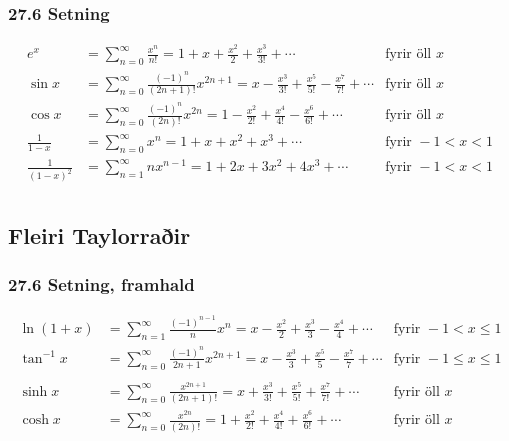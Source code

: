  \subsubsection{27.6 Setning}{\small
\begin{align*}
e^x&=\sum_{n=0}^\infty\frac{x^n}{n!}
    =1+x+\frac{x^2}{2}+\frac{x^3}{3!}
    +\cdots
  &\mbox{fyrir öll }x\\
\sin x&=  \sum_{n=0}^\infty\frac{(-1)^n}{(2n+1)!}x^{2n+1}
    =x-\frac{x^3}{3!}+\frac{x^5}{5!}-\frac{x^7}{7!}+\cdots
     &\mbox{fyrir öll }x\\ 
\cos x&=  \sum_{n=0}^\infty\frac{(-1)^n}{(2n)!}x^{2n}
    =1-\frac{x^2}{2!}+\frac{x^4}{4!}-\frac{x^6}{6!}+\cdots
    &\mbox{fyrir öll }x\\
\frac{1}{1-x}&=\sum_{n=0}^\infty x^n
    =1+x+x^2+x^3+\cdots
&\mbox{fyrir }-1<x<1\\
\frac{1}{(1-x)^2}&=\sum_{n=1}^\infty nx^{n-1}
    =1+2x+3x^2+4x^3+\cdots
&\mbox{fyrir }-1<x<1\\
\end{align*}}



\subsection[t]{Fleiri Taylorraðir}
\subsubsection{27.6 Setning, framhald}{\small
\begin{align*}
\ln(1+x)&=  \sum_{n=1}^\infty\frac{(-1)^{n-1}}{n}x^n
    =x-\frac{x^2}{2}+\frac{x^3}{3}-\frac{x^4}{4}+\cdots
    &\mbox{fyrir }-1<x\leq 1\\
\tan^{-1} x&=  \sum_{n=0}^\infty\frac{(-1)^n}{2n+1}x^{2n+1}
    =x-\frac{x^3}{3}+\frac{x^5}{5}-\frac{x^7}{7}+\cdots
    &\mbox{fyrir }-1\leq x\leq 1\\\\
\sinh x&=  \sum_{n=0}^\infty\frac{x^{2n+1}}{(2n+1)!}
    =x+\frac{x^3}{3!}+\frac{x^5}{5!}+\frac{x^7}{7!}+\cdots
    &\mbox{fyrir öll } x\\
\cosh x&=  \sum_{n=0}^\infty\frac{x^{2n}}{(2n)!}
    =1+\frac{x^2}{2!}+\frac{x^4}{4!}+\frac{x^6}{6!}+\cdots
    &\mbox{fyrir öll } x\\
\end{align*} }
 





